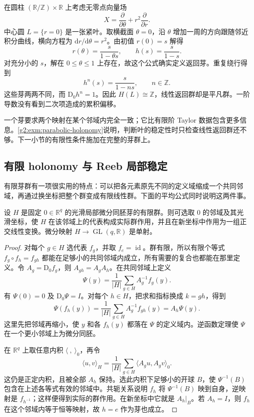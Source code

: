 \begin{example}\label{g2:exm:parabolic-holonomy}
	在圆柱 \((\mathbb R/\mathbb Z)\times\mathbb R\) 上考虑无零点向量场
	\[
		X=\frac{\partial}{\partial\theta}+r^2\frac{\partial}{\partial r}.
	\]
	中心圆 \(L=\{r=0\}\) 是一张紧叶。取横截面 \(\theta=0\)，沿 \(\theta\) 增加一周的方向跟随邻近积分曲线，横向方程为 \(\mathrm dr/\mathrm d\theta=r^2\)。由初值 \(r(0)=s\) 解得
	\[
		r(\theta)=\frac{s}{1-\theta s},\qquad h(s)=\frac{s}{1-s}.
	\]
	对充分小的 \(s\)，解在 \(0\leq\theta\leq1\) 上存在，故这个公式确实定义返回芽。重复绕行得到
	\[
		h^n(s)=\frac{s}{1-ns},\qquad n\in\mathbb Z.
	\]
	这些芽两两不同，而 \(\mathrm D_0h^n=1\)。因此 \(H(L)\cong\mathbb Z\)，线性返回群却是平凡群。一阶导数没有看到二次项造成的累积偏移。
\end{example}

一个芽要求两个映射在某个邻域内完全一致；它比有限阶 Taylor 数据包含更多信息。\cref{g2:exm:parabolic-holonomy}说明，判断叶的稳定性时只检查线性返回群还不够。下一小节的有限性条件施加在完整的芽群上。

\subsection{有限 holonomy 与 Reeb 局部稳定}
\label{g2:subsec:D01:03}

有限芽群有一项很实用的特点：可以把各元素原先不同的定义域缩成一个共同邻域，再通过换坐标把整个群变成有限线性群。下面的平均公式同时说明这两件事。

\begin{lemma}\label{g2:lem:finite-germ-linearization}
	设 \(H\) 是固定 \(0\in\mathbb R^q\) 的光滑局部微分同胚芽的有限群。则可选取 \(0\) 的邻域及其光滑坐标，使 \(H\) 在该邻域上的代表构成实际群作用，并且在新坐标中作用为一组正交线性变换。微分映射 \(H\to\operatorname{GL}(q,\mathbb R)\) 是单射。
\end{lemma}
\begin{proof}
	对每个 \(g\in H\) 选代表 \(f_g\)，并取 \(f_e=\operatorname{id}\)。群有限，所以有限个等式 \(f_g\circ f_h=f_{gh}\) 都能在足够小的共同邻域内成立，所有需要的复合也都能在那里定义。令 \(A_g=\mathrm D_0f_g\)，则 \(A_{gh}=A_gA_h\)。在共同邻域上定义
	\[
		\Psi(y)=\frac1{|H|}\sum_{g\in H}A_g^{-1}f_g(y).
	\]
	有 \(\Psi(0)=0\) 及 \(\mathrm D_0\Psi=I\)。对每个 \(h\in H\)，把求和指标换成 \(k=gh\)，得到
	\[
		\Psi(f_h(y))
		=\frac1{|H|}\sum_{g\in H}A_g^{-1}f_{gh}(y)
		=A_h\Psi(y).
	\]
	这里先把邻域再缩小，使 \(y\) 和各 \(f_h(y)\) 都落在 \(\Psi\) 的定义域内。逆函数定理使 \(\Psi\) 在一个更小邻域上为微分同胚。

	在 \(\mathbb R^q\) 上取任意内积 \(\langle\ ,\ \rangle_0\)，再令
	\[
		\langle u,v\rangle_H=\frac1{|H|}\sum_{g\in H}\langle A_gu,A_gv\rangle_0.
	\]
	这仍是正定内积，且被全部 \(A_h\) 保持。选此内积下足够小的开球 \(B\)，使 \(\Psi^{-1}(B)\) 包含在上述各等式有效的邻域中。共轭关系说明 \(f_h\) 将 \(\Psi^{-1}(B)\) 映到自身，逆映射是 \(f_{h^{-1}}\)；这样便得到实际的群作用。在新坐标中它就是 \(A_h|_B\)。若 \(A_h=I\)，则 \(f_h\) 在这个邻域内等于恒等映射，故 \(h=e\) 作为芽也成立。
\end{proof}

